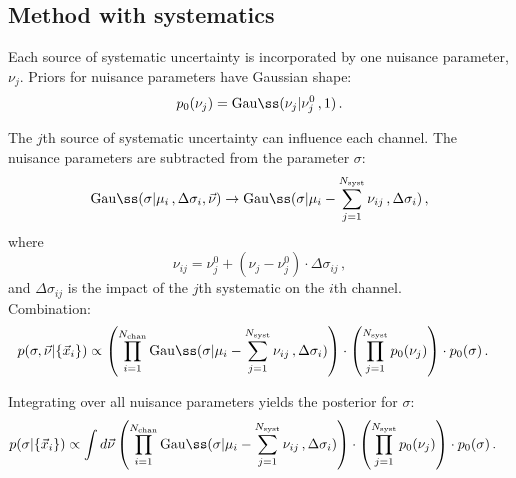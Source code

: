 \documentclass[11pt, a4paper]{article}
\begin{document}
\clearpage
\pagebreak

\subsection*{Method with systematics} 
%
Each source of systematic uncertainty is incorporated by one nuisance
parameter, $\nu_{j}$. Priors for nuisance parameters have Gaussian
shape:
%
\begin{equation}
p_{0}(\nu_{j}) = \mathrm{Gau{\ss}}(\nu_{j}|\nu_{j}^{0} \, , 1) \, .
\end{equation}

The $j$th source of systematic uncertainty can influence each
channel. The nuisance parameters are subtracted from the parameter
$\sigma$:
%
\begin{equation}
\mathrm{Gau{\ss}}(\sigma|\mu_{i}\, , \Delta \sigma_{i}, \vec{\nu}) \rightarrow \mathrm{Gau{\ss}}(\sigma|\mu_{i}-\sum_{j=1}^{N_{\mathrm{syst}}}\nu_{ij}  \, , \Delta \sigma_{i}) \, ,
\end{equation}
%
where
%
\begin{equation}
\nu_{ij} = \nu_{j}^{0} + (\nu_{j}-\nu_{j}^{0}) \cdot \Delta \sigma_{ij} \, ,
\end{equation}
%
and $\Delta \sigma_{ij}$ is the impact of the $j$th systematic on the $i$th channel. \\

Combination:
%
\begin{eqnarray}
p(\sigma, \vec{\nu}|\{ \vec{x}_{i}\}) & \propto \left( \prod_{i=1}^{N_{\mathrm{chan}}} \mathrm{Gau{\ss}}(\sigma|\mu_{i}-\sum_{j=1}^{N_{\mathrm{syst}}}\nu_{ij} \, , \Delta \sigma_{i}) \right) \cdot \left( \prod_{j=1}^{N_{\mathrm{syst}}} p_{0}(\nu_{j}) \right) \cdot p_{0}(\sigma) \, .
\end{eqnarray}

Integrating over all nuisance parameters yields the posterior for $\sigma$:
%
%
\begin{eqnarray}
p(\sigma|\{ \vec{x}_{i}\}) & \propto \int d\vec{\nu} \left( \prod_{i=1}^{N_{\mathrm{chan}}} \mathrm{Gau{\ss}}(\sigma|\mu_{i}-\sum_{j=1}^{N_{\mathrm{syst}}}\nu_{ij} \, , \Delta \sigma_{i}) \right) \cdot \left( \prod_{j=1}^{N_{\mathrm{syst}}} p_{0}(\nu_{j}) \right) \cdot p_{0}(\sigma) \, .
\end{eqnarray}
\end{document}
